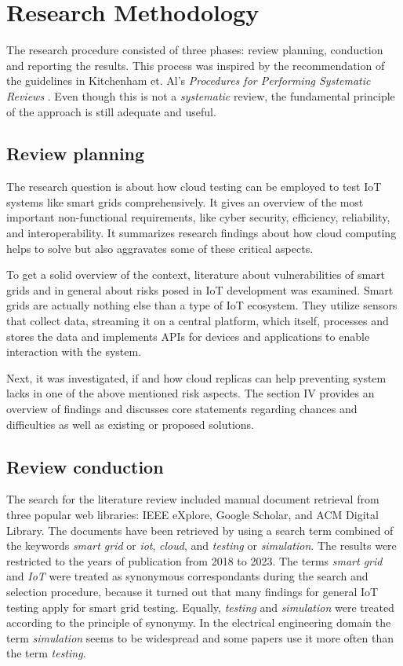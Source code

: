 \section{Research Methodology}
The research procedure consisted of three phases: review planning, conduction and reporting the results. This process was inspired by the recommendation of the guidelines in Kitchenham et. Al's \textit{Procedures for Performing Systematic Reviews} \cite{kitchenham2004procedures}. Even though this is not a \textit{systematic} review, the fundamental principle of the approach is still adequate and useful.

\subsection{Review planning}
The research question is about how cloud testing can be employed to test IoT systems like smart grids comprehensively. It gives an overview of the most important non-functional requirements, like cyber security, efficiency, reliability, and interoperability. It summarizes research findings about how cloud computing helps to solve but also aggravates some of these critical aspects.

To get a solid overview of the context, literature about vulnerabilities of smart grids and in general about risks posed in IoT development was examined. Smart grids are actually nothing else than a type of IoT ecosystem. They utilize sensors that collect data, streaming it on a central platform, which itself, processes and stores the data and implements APIs for devices and applications to enable interaction with the system. 

Next, it was investigated, if and how cloud replicas can help preventing system lacks in one of the above mentioned risk aspects. The section IV provides an overview of findings and discusses core statements regarding chances and difficulties as well as existing or proposed solutions.

\subsection{Review conduction}

The search for the literature review included manual document retrieval from three popular web libraries: IEEE eXplore, Google Scholar, and ACM Digital Library. The documents have been retrieved by using a search term combined of the keywords \textit{smart grid} or \textit{iot}, \textit {cloud}, and \textit{testing} or \textit{simulation}. The results were restricted to the years of publication from 2018 to 2023. The terms \textit{smart grid} and \textit{IoT} were treated as synonymous correspondants during the search and selection procedure, because it turned out that many findings for general IoT testing apply for smart grid testing. Equally, \textit{testing} and \textit{simulation} were treated according to the principle of synonymy. In the electrical engineering domain the term \textit{simulation} seems to be widespread and some papers use it more often than the term \textit{testing}.

